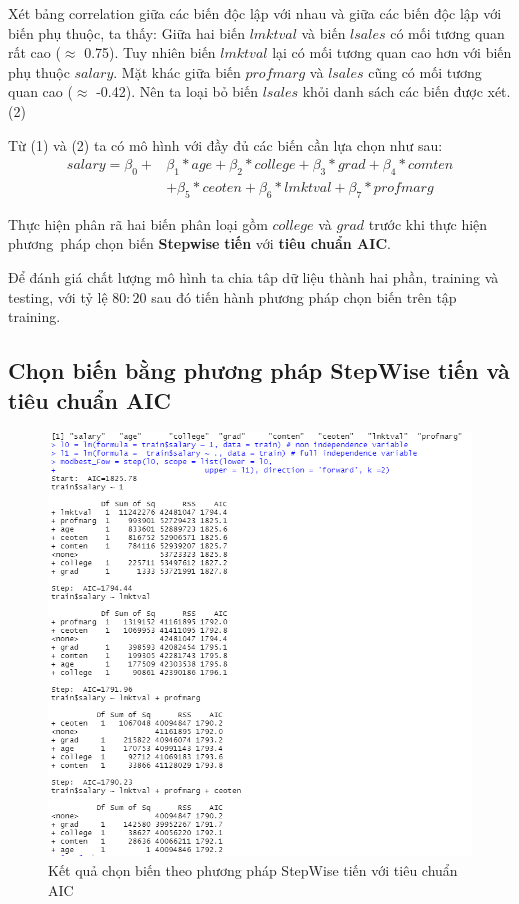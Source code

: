 Xét bảng correlation giữa các biến độc lập với nhau và giữa các biến độc lập với biến phụ thuộc, ta thấy: Giữa hai biến $\textit{lmktval}$ và biến $\textit{lsales}$ có mối tương quan rất cao ($\approx$ 0.75). Tuy nhiên biến $\textit{lmktval}$ lại có mối tương quan cao hơn với biến phụ thuộc $\textit{salary}$. Mặt khác giữa biến $\textit{profmarg}$ và $\textit{lsales}$ cũng có mối tương quan cao ($\approx$ -0.42). Nên ta loại bỏ biến $\textit{lsales}$ khỏi danh sách các biến được xét. (2)

Từ (1) và (2) ta có mô hình với đầy đủ các biến cần lựa chọn như sau:
\begin{equation}\label{eq-b1:full-model}
	\begin{split}
		salary 	= \beta_0 + &\beta_1*age + \beta_2*college + \beta_3*grad + \beta_4*comten\\
		&+ \beta_5*ceoten + \beta_6*lmktval + \beta_7*profmarg
	\end{split}
\end{equation}


Thực hiện phân rã hai biến phân loại gồm $college$ và $grad$ trước khi thực hiện phương~pháp chọn biến \textbf{Stepwise} \textbf{tiến} với \textbf{tiêu chuẩn AIC}.

Để đánh giá chất lượng mô hình ta chia tâp dữ liệu thành hai phần, training và testing, với tỷ lệ $80:20$ sau đó tiến hành phương pháp chọn biến trên tập training.

\subsection*{Chọn biến bằng phương pháp StepWise tiến và tiêu chuẩn AIC}

\begin{figure}[H]
	\centering
	\includegraphics[width=\linewidth]{../Photo Of Result/B1_stepwiseForward.PNG}  
	\caption{Kết quả chọn biến theo phương pháp StepWise tiến với tiêu chuẩn AIC}
	\label{fig-b1:stepwise-forward}
\end{figure}

